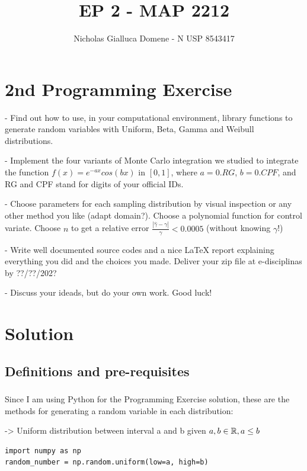 \documentclass{homework}
\title{EP 2 - MAP 2212}
\author{Nicholas Gialluca Domene - N USP 8543417}
\begin{document}
\maketitle

\section{2nd Programming Exercise}

- Find out how to use, in your computational environment, library functions to generate random variables with Uniform, Beta, Gamma and Weibull distributions.

- Implement the four variants of Monte Carlo integration we studied to integrate the function $f(x) = e^{-ax}cos(bx)$ in $[0, 1]$, where $a = 0.RG$, $b = 0.CPF$, and RG and CPF stand for digits of your official IDs.

- Choose parameters for each sampling distribution by visual inspection or any other method you like (adapt domain?). Choose a polynomial function for control variate. Choose $n$ to get a relative error $\frac{|\hat\gamma - \gamma |}{\gamma} < 0.0005$ (without knowing $\gamma$!)

- Write well documented source codes and a nice LaTeX report explaining everything you did and the choices you made. Deliver your zip file at e-disciplinas by ??/??/202?

- Discuss your ideads, but do your own work. Good luck!

\section{Solution}

\subsection {Definitions and pre-requisites}

\subsubsection{}
 Since I am using Python for the Programming Exercise solution, these are the methods for generating a random variable in each distribution:

-> Uniform distribution between interval a and b given $a, b \in \mathbb R, a \leq b$

\begin{lstlisting}
import numpy as np
random_number = np.random.uniform(low=a, high=b)
\end{lstlisting}
\end{document}
